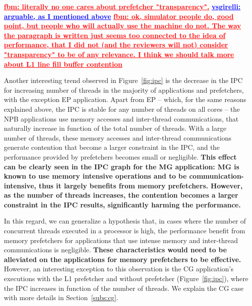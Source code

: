 \documentclass[AMA,final,STIX1COL]{WileyNJD-v2}
\newcommand{\vsg}[1]{\textcolor{blue}{\bfseries \ul{vsgirelli: #1} }\vspace{0.2cm}}
\newcommand{\fbm}[1]{\textcolor{red}{\bfseries \ul{fbm: #1} }\vspace{0.2cm}}
\begin{document}
\fbm{literally no one cares about prefetcher "transparency".}\vsg{arguable, as I mentioned above} \fbm{ok, simulator people do, good point, but people who will actually use the machine do not. The way the paragraph is written just seems too connected to the idea of performance, that I did not (and the reviewers will not) consider "transparency" to be of any relevance. I think we should talk more about L1 line fill buffer contention}%



Another interesting trend observed in Figure~\ref{fig:ipc} is the decrease in the IPC for increasing number of threads in the majority of applications and prefetchers, with the exception EP application.
Apart from EP -- which, for the same reasons explained above, the IPC is stable for any number of threads on all cores -- the NPB applications use memory accesses and inter-thread communications, that naturally increase in function of the total number of threads. 
With a large number of threads, these memory accesses and inter-thread communications generate contention that become a larger constraint in the IPC, and the performance provided by prefetchers becomes small or negligible. %
\textbf{This effect can be clearly seen in the IPC graph for the MG application: MG is known to use memory intensive operations and to be communication-intensive, thus it largely benefits from memory prefetchers. 
However, as the number of threads increases, the contention becomes a larger constraint in the IPC results, significantly harming the performance.}

In this regard, we can generalize a hypothesis that, in cases where the number of concurrent threads executed in a processor is high, the performance benefit from memory prefetchers for applications that use intense memory and inter-thread communications is negligible. 
\textbf{These characteristics would need to be alleviated on the applications for memory prefetchers to be effective.} 
However, an interesting exception to this observation is the CG application's executions with the L1 prefetcher and without prefetcher (Figure~\ref{fig:ipc}), where the IPC increases in function of the number of threads. 
We explain the CG case with more details in Section~\ref{subs:cg}.
\end{document}
